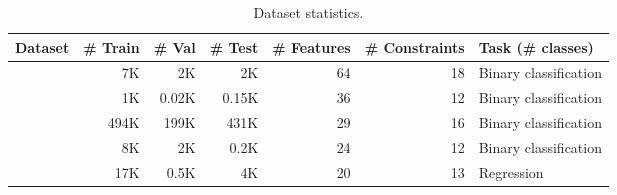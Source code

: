 \begin{table}[t]
\centering
\caption{Dataset statistics.}
\begin{tabular}{lrrrrrl}
\toprule
Dataset & \# Train & \# Val & \# Test &  \# Features & \# Constraints & Task (\# classes)                   \\ 
\midrule
\phishing{}     & 7K     & 2K   & 2K  & 64 &         18  &  Binary classification                  \\
\cervical{}    &  1K & 0.02K & 0.15K&      36 &  12 & Binary classification            \\
\lcld{}    & 494K   & 199K & 431K & 29 &    16      & Binary classification                   \\
\heloc{}   & 8K     & 2K   & 0.2K  & 24 &    12     & Binary classification               \\
\house{}    &  17K &0.5K & 4K & 20 &      13  & Regression                           \\ 
\bottomrule
\end{tabular}
\label{tab:app_dataset}
\end{table}
